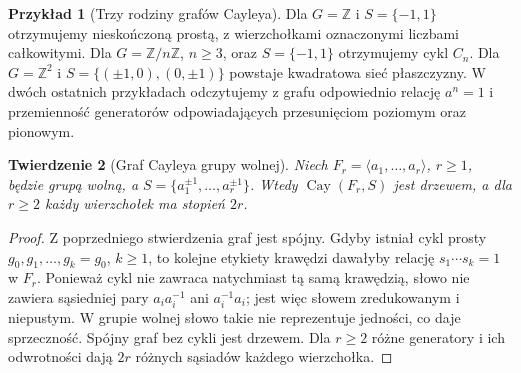 \documentclass[11pt,a4paper]{report}
\numberwithin{equation}{section}
\theoremstyle{plain}
\newtheorem{twierdzenie}{Twierdzenie}[section]
\theoremstyle{definition}
\newtheorem{przyklad}[twierdzenie]{Przykład}
\theoremstyle{remark}
\begin{document}
\begin{przyklad}[Trzy rodziny grafów Cayleya]
Dla $G=\mathbb Z$ i $S=\{-1,1\}$ otrzymujemy
nieskończoną prostą, z wierzchołkami oznaczonymi liczbami całkowitymi.
Dla $G=\mathbb Z/n\mathbb Z$, $n\ge3$, oraz $S=\{-1,1\}$
otrzymujemy cykl $C_n$. Dla $G=\mathbb Z^2$ i
$S=\{(\pm1,0),(0,\pm1)\}$ powstaje kwadratowa sieć
płaszczyzny. W dwóch ostatnich przykładach odczytujemy
z grafu odpowiednio relację $a^n=1$ i przemienność
generatorów odpowiadających przesunięciom poziomym
oraz pionowym.
\end{przyklad}

\begin{center}
\end{center}

\begin{twierdzenie}[Graf Cayleya grupy wolnej]
Niech $F_r=\langle a_1,\ldots,a_r\rangle$, $r\ge1$,
będzie grupą wolną, a $S=\{a_1^{\pm1},\ldots,a_r^{\pm1}\}$.
Wtedy $\operatorname{Cay}(F_r,S)$ jest drzewem,
a dla $r\ge2$ każdy wierzchołek ma stopień $2r$.
\end{twierdzenie}
\begin{proof}
Z poprzedniego stwierdzenia graf jest spójny. Gdyby istniał
cykl prosty $g_0,g_1,\ldots,g_k=g_0$, $k\ge1$, to
kolejne etykiety krawędzi dawałyby relację
$s_1\cdots s_k=1$ w $F_r$. Ponieważ cykl nie zawraca
natychmiast tą samą krawędzią, słowo nie zawiera sąsiedniej
pary $a_i a_i^{-1}$ ani $a_i^{-1}a_i$; jest więc słowem
zredukowanym i niepustym. W grupie wolnej słowo takie
nie reprezentuje jedności, co daje sprzeczność.
Spójny graf bez cykli jest drzewem. Dla $r\ge2$
różne generatory i ich odwrotności dają $2r$
różnych sąsiadów każdego wierzchołka.
\end{proof}
\end{document}
